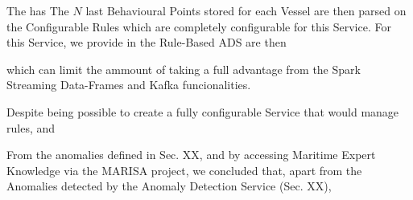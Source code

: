 The has 
The $N$ last Behavioural Points stored for each Vessel are then parsed on the Configurable Rules which are completely configurable for this Service. For this Service, we provide  in the Rule-Based ADS are then 

which can limit the ammount of taking a full advantage from the Spark Streaming Data-Frames and Kafka funcionalities.

Despite being possible to create a fully configurable Service that would manage rules, and 

From the anomalies defined in Sec. XX, and by accessing Maritime Expert Knowledge via the MARISA project, we concluded that, apart from the Anomalies detected by the Anomaly Detection Service (Sec. XX), 




